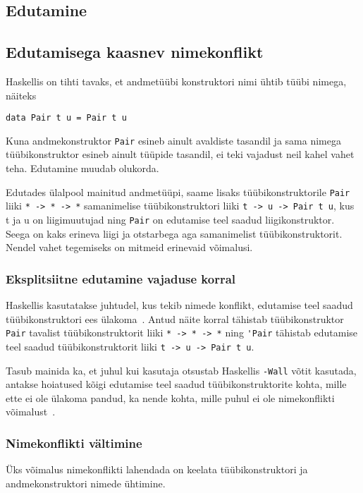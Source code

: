 \documentclass[12pt]{article}
\begin{document}
    \subsection{Edutamine}
      
    \subsection{Edutamisega kaasnev nimekonflikt}
      Haskellis on tihti tavaks, et andmetüübi konstruktori nimi ühtib tüübi nimega, näiteks

      \begin{verbatim}data Pair t u = Pair t u\end{verbatim}

      Kuna andmekonstruktor \verb!Pair! esineb ainult avaldiste tasandil ja sama nimega tüübikonstruktor esineb ainult tüüpide tasandil, ei teki vajadust neil kahel vahet teha. Edutamine muudab olukorda.

      Edutades ülalpool mainitud andmetüüpi, saame lisaks tüübikonstruktorile \verb!Pair! liiki \verb!* -> * -> *! samanimelise tüübikonstruktori liiki \verb!t -> u -> Pair t u!, kus t ja u on liigimuutujad ning \verb!Pair! on edutamise teel saadud liigikonstruktor. Seega on kaks erineva liigi ja otstarbega aga samanimelist tüübikonstruktorit. Nendel vahet tegemiseks on mitmeid erinevaid võimalusi.
      \subsubsection{Eksplitsiitne edutamine vajaduse korral}
        Haskellis kasutatakse juhtudel, kus tekib nimede konflikt, edutamise teel saadud tüübikonstruktori ees ülakoma~\cite{Giv}. Antud näite korral tähistab tüübikonstruktor \verb!Pair! tavalist tüübikonstruktorit liiki \verb!* -> * -> *! ning \verb!'Pair! tähistab edutamise teel saadud tüübikonstruktorit liiki \verb!t -> u -> Pair t u!.

        Tasub mainida ka, et juhul kui kasutaja otsustab Haskellis \verb!-Wall! võtit kasutada, antakse hoiatused kõigi edutamise teel saadud tüübikonstruktorite kohta, mille ette ei ole ülakoma pandud, ka nende kohta, mille puhul ei ole nimekonflikti võimalust~\cite{Gla}.
      \subsubsection{Nimekonflikti vältimine}
        Üks võimalus nimekonflikti lahendada on keelata tüübikonstruktori ja andmekonstruktori nimede ühtimine.
\end{document}
